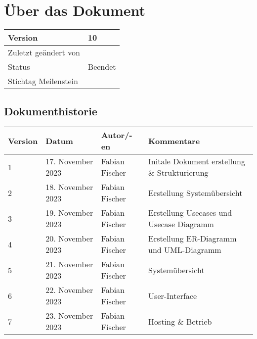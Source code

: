 \section{Über das Dokument}

\begin{table}[H]
  \begin{tabular}{|l|l|}
    \hline
   Version & 10 \\ \hline
   Zuletzt geändert von & \date{\today} \\ \hline
   Status & Beendet \\ \hline
   Stichtag Meilenstein &  \\ \hline
  \end{tabular}
\end{table}

\subsection{Dokumenthistorie}

\begin{table}[H]
  \begin{tabular}{|l|l|l|l|}
    \hline
   Version & Datum & Autor/-en & Kommentare \\ \hline
   1 & 17. November 2023 & Fabian Fischer & Initale Dokument erstellung \& Strukturierung \\ \hline
   2 & 18. November 2023 & Fabian Fischer & Erstellung Systemübersicht \\ \hline
   3 & 19. November 2023 & Fabian Fischer & Erstellung Usecases und Usecase Diagramm \\ \hline
   4 & 20. November 2023 & Fabian Fischer & Erstellung ER-Diagramm und UML-Diagramm \\ \hline
   5 & 21. November 2023 & Fabian Fischer & Systemübersicht \\ \hline
   6 & 22. November 2023 & Fabian Fischer & User-Interface \\ \hline
   7 & 23. November 2023 & Fabian Fischer & Hosting \& Betrieb \\ \hline
  \end{tabular}
\end{table}
